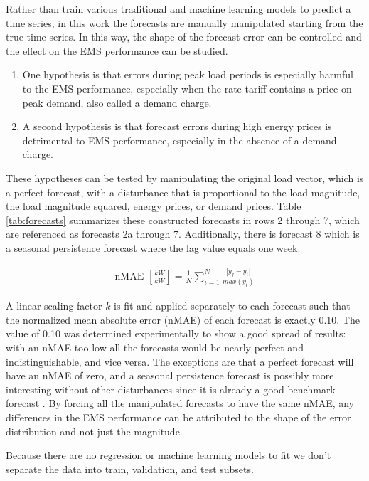 \documentclass[conference]{IEEEtran}
\begin{document}
Rather than train various traditional and machine learning models to predict a time series, in this work the forecasts are manually manipulated starting from the true time series. In this way, the shape of the forecast error can be controlled and the effect on the EMS performance can be studied. 

\begin{enumerate}
\item One hypothesis is that errors during peak load periods is especially harmful to the EMS performance, especially when the rate tariff contains a price on peak demand, also called a demand charge.

\item A second hypothesis is that forecast errors during high energy prices is detrimental to EMS performance, especially in the absence of a demand charge.
\end{enumerate}

These hypotheses can be tested by manipulating the original load vector, which is a perfect forecast, with a disturbance that is proportional to the load magnitude, the load magnitude squared, energy prices, or demand prices. Table \ref{tab:forecasts} summarizes these constructed forecasts in rows 2 through 7, which are referenced as forecasts 2a through 7. Additionally, there is forecast 8 which is a seasonal persistence forecast where the lag value equals one week.

\begin{align}
    \text{nMAE } [\frac{kW}{kW}] = \frac{1}{N} \sum_{i=1}^N \frac{|y_f - y_t|}{max(y_t)} \label{eq:nmae} 
\end{align} 

A linear scaling factor $k$ is fit and applied separately to each forecast such that the normalized mean absolute error (nMAE) of each forecast is exactly 0.10. The value of 0.10 was determined experimentally to show a good spread of results: with an nMAE too low all the forecasts would be nearly perfect and indistinguishable, and vice versa.  The exceptions are that a perfect forecast will have an nMAE of zero, and a seasonal persistence forecast is possibly more interesting without other disturbances since it is already a good benchmark forecast \cite{b9}. By forcing all the manipulated forecasts to have the same nMAE, any differences in the EMS performance can be attributed to the shape of the error distribution and not just the magnitude.

Because there are no regression or machine learning models to fit we don't separate the data into train, validation, and test subsets.
\end{document}
